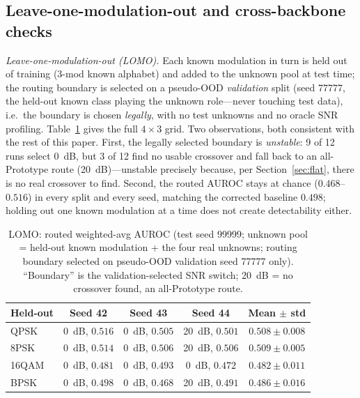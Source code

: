 \documentclass[review,12pt]{elsarticle}
\begin{document}
\subsection{Leave-one-modulation-out and cross-backbone checks}
\label{sec:lomo}

\emph{Leave-one-modulation-out (LOMO).} Each known modulation in turn is
held out of training (3-mod known alphabet) and added to the unknown
pool at test time; the routing boundary is selected on a pseudo-OOD
\emph{validation} split (seed 77777, the held-out known class playing
the unknown role---never touching test data), i.e.\ the boundary is
chosen \emph{legally}, with no test unknowns and no oracle SNR
profiling. Table~\ref{tab:lomo} gives the full $4 \times 3$ grid. Two
observations, both consistent with the rest of this paper. First, the
legally selected boundary is \emph{unstable}: 9 of 12 runs select
\SI{0}{dB}, but 3 of 12 find no usable crossover and fall back to an
all-Prototype route (\SI{20}{dB})---unstable precisely because, per
Section~\ref{sec:flat}, there is no real crossover to find. Second, the
routed AUROC stays at chance ($0.468$--$0.516$) in every split and
every seed, matching the corrected baseline $0.498$; holding out one
known modulation at a time does not create detectability either.

\begin{table}[H]
\centering
\caption{LOMO: routed weighted-avg AUROC (test seed 99999; unknown pool
= held-out known modulation + the four real unknowns; routing boundary
selected on pseudo-OOD validation seed 77777 only). ``Boundary'' is the
validation-selected SNR switch; \SI{20}{dB} = no crossover found, an
all-Prototype route.}
\label{tab:lomo}
\begin{tabular}{lcccc}
\toprule
Held-out & Seed 42 & Seed 43 & Seed 44 & Mean $\pm$ std \\
\midrule
QPSK  & \SI{0}{dB}, $0.516$ & \SI{0}{dB}, $0.505$ & \SI{20}{dB}, $0.501$ & $0.508 \pm 0.008$ \\
8PSK  & \SI{0}{dB}, $0.514$ & \SI{0}{dB}, $0.506$ & \SI{20}{dB}, $0.506$ & $0.509 \pm 0.005$ \\
16QAM & \SI{0}{dB}, $0.481$ & \SI{0}{dB}, $0.493$ & \SI{0}{dB}, $0.472$  & $0.482 \pm 0.011$ \\
BPSK  & \SI{0}{dB}, $0.498$ & \SI{0}{dB}, $0.468$ & \SI{20}{dB}, $0.491$ & $0.486 \pm 0.016$ \\
\bottomrule
\end{tabular}
\end{table}
\end{document}
